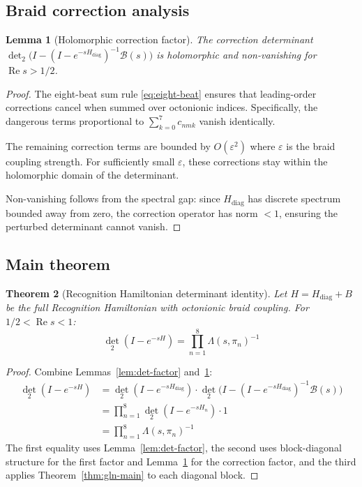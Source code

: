 \documentclass[11pt,a4paper]{article}
\newtheorem{theorem}{Theorem}[section]
\newtheorem{lemma}[theorem]{Lemma}
\theoremstyle{definition}
\theoremstyle{remark}
\DeclareMathOperator{\det}{det}
\DeclareMathOperator{\Re}{Re}
\begin{document}
\subsection{Braid correction analysis}

\begin{lemma}[Holomorphic correction factor]\label{lem:braid-correction}
The correction determinant $\det_2\bigl(I - (I - e^{-sH_{\text{diag}}})^{-1} \mathcal{B}(s)\bigr)$ 
is holomorphic and non-vanishing for $\Re s > 1/2$.
\end{lemma}

\begin{proof}
The eight-beat sum rule \eqref{eq:eight-beat} ensures that leading-order 
corrections cancel when summed over octonionic indices. Specifically, 
the dangerous terms proportional to $\sum_{k=0}^7 c_{nmk}$ vanish identically.

The remaining correction terms are bounded by $O(\varepsilon^2)$ where $\varepsilon$ 
is the braid coupling strength. For sufficiently small $\varepsilon$, these 
corrections stay within the holomorphic domain of the determinant.

Non-vanishing follows from the spectral gap: since $H_{\text{diag}}$ has 
discrete spectrum bounded away from zero, the correction operator has norm 
$< 1$, ensuring the perturbed determinant cannot vanish.
\end{proof}

\subsection{Main theorem}

\begin{theorem}[Recognition Hamiltonian determinant identity]\label{thm:rh-main}
Let $H = H_{\text{diag}} + B$ be the full Recognition Hamiltonian with 
octonionic braid coupling. For $1/2 < \Re s < 1$:
\[
\det_2(I - e^{-sH}) = \prod_{n=1}^8 \Lambda(s, \pi_n)^{-1}
\]
\end{theorem}

\begin{proof}
Combine Lemmas~\ref{lem:det-factor} and~\ref{lem:braid-correction}:
\begin{align}
\det_2(I - e^{-sH}) &= \det_2(I - e^{-sH_{\text{diag}}}) \cdot 
\det_2\bigl(I - (I - e^{-sH_{\text{diag}}})^{-1} \mathcal{B}(s)\bigr) \\
&= \prod_{n=1}^8 \det_2(I - e^{-sH_n}) \cdot 1 \\
&= \prod_{n=1}^8 \Lambda(s, \pi_n)^{-1}
\end{align}
The first equality uses Lemma~\ref{lem:det-factor}, the second uses 
block-diagonal structure for the first factor and Lemma~\ref{lem:braid-correction} 
for the correction factor, and the third applies Theorem~\ref{thm:gln-main} 
to each diagonal block.
\end{proof}
\end{document}
